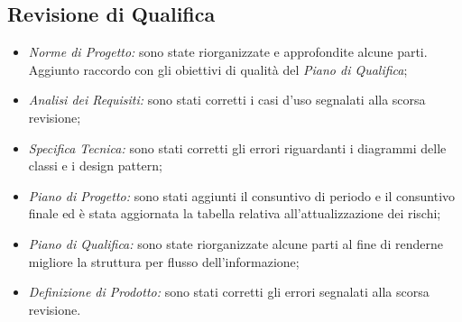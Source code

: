 \subsection{Revisione di Qualifica}
\begin{itemize}
\item \emph{Norme di Progetto: }sono state riorganizzate e approfondite alcune parti. Aggiunto raccordo con gli obiettivi di qualità del \emph{Piano di Qualifica};

\item \emph{Analisi dei Requisiti: }sono stati corretti i casi d'uso segnalati alla scorsa revisione;

\item \emph{Specifica Tecnica: }sono stati corretti gli errori riguardanti i diagrammi delle classi e i design pattern;

\item \emph{Piano di Progetto: }sono stati aggiunti il consuntivo di periodo e il consuntivo finale ed è stata aggiornata la tabella relativa all'attualizzazione dei rischi;

\item \emph{Piano di Qualifica: }sono state riorganizzate alcune parti al fine di renderne migliore la struttura per flusso dell'informazione;

\item \emph{Definizione di Prodotto: }sono stati corretti gli errori segnalati alla scorsa revisione.
\end{itemize}